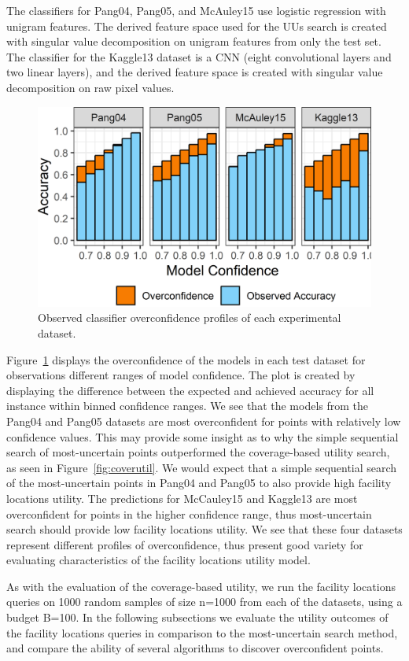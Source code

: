 \documentclass[10pt, conference]{IEEEtran}
\begin{document}
The classifiers for Pang04, Pang05, and McAuley15 use logistic regression with unigram features. The derived feature space used for the UUs search is created with singular value decomposition on unigram features from only the test set. The classifier for the Kaggle13 dataset is a CNN (eight convolutional layers and two linear layers), and the derived feature space is created with singular value decomposition on raw pixel values.

\begin{figure}[hbtp]
  \includegraphics[width=.49\textwidth]{overconfidence.png}
  \caption{Observed classifier overconfidence profiles of each experimental dataset.}
  \label{fig:overconf}
\end{figure}

Figure~\ref{fig:overconf} displays the overconfidence of the models in each test dataset for observations different ranges of model confidence. The plot is created by displaying the difference between the expected and achieved accuracy for all instance within binned confidence ranges. We see that the models from the Pang04 and Pang05 datasets are most overconfident for points with relatively low confidence values. This may provide some insight as to why the simple sequential search of most-uncertain points outperformed the coverage-based utility search, as seen in Figure~\ref{fig:coverutil}. We would expect that a simple sequential search of the most-uncertain points in Pang04 and Pang05 to also provide high facility locations utility. The predictions for McCauley15 and Kaggle13 are most overconfident for points in the higher confidence range, thus most-uncertain search should provide low facility locations utility. We see that these four datasets represent different profiles of overconfidence, thus present good variety for evaluating characteristics of the facility locations utility model. 

As with the evaluation of the coverage-based utility, we run the facility locations queries on 1000 random samples of size n=1000 from each of the datasets, using a budget B=100. In the following subsections we evaluate the utility outcomes of the facility locations queries in comparison to the most-uncertain search method, and compare the ability of several algorithms to discover overconfident points.
\end{document}

